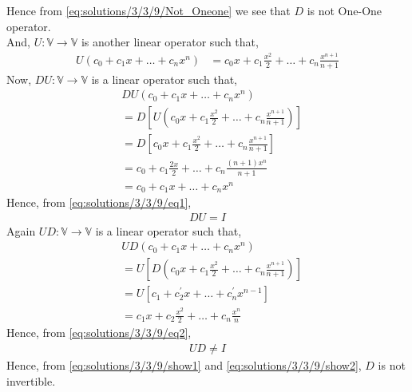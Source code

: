 Hence from \eqref{eq:solutions/3/3/9/Not_Oneone} we see that $D$ is not One-One operator.\\
And, $U:\mathbb{V} \xrightarrow{} \mathbb{V}$ is another linear operator such that,
\begin{align}
U(c_0+c_1x+\dots+c_nx^n) &= c_0x+c_1\frac{x^2}{2}+\dots+c_n\frac{x^{n+1}}{n+1}
\end{align}
Now, $DU:\mathbb{V} \xrightarrow{} \mathbb{V}$ is a linear operator such that,
\begin{align}
&DU(c_0+c_1x+\dots+c_nx^n) \\
&= D[U(c_0x+c_1\frac{x^2}{2}+\dots+c_n\frac{x^{n+1}}{n+1})]\\
&= D[c_0x+c_1\frac{x^2}{2}+\dots+c_n\frac{x^{n+1}}{n+1}]\\
&= c_0+c_1\frac{2x}{2}+\dots+c_n\frac{(n+1)x^{n}}{n+1}\\
&= c_0+c_1x+\dots+c_nx^n\label{eq:solutions/3/3/9/eq1}
\end{align}
Hence, from \eqref{eq:solutions/3/3/9/eq1},
\begin{align}
DU = I\label{eq:solutions/3/3/9/show1}
\end{align}
Again $UD:\mathbb{V} \xrightarrow{} \mathbb{V}$ is a linear operator such that,
\begin{align}
&UD(c_0+c_1x+\dots+c_nx^n) \\
&= U[D(c_0x+c_1\frac{x^2}{2}+\dots+c_n\frac{x^{n+1}}{n+1})]\\
&= U[c_1+c^{\prime}_2x+\dots+c^{\prime}_nx^{n-1}]\\
&= c_1x+c_2\frac{x^2}{2}+\dots+c_n\frac{x^{n}}{n}\label{eq:solutions/3/3/9/eq2}\
\end{align}
Hence, from \eqref{eq:solutions/3/3/9/eq2},
\begin{align}
UD \ne I\label{eq:solutions/3/3/9/show2}
\end{align}
Hence, from \eqref{eq:solutions/3/3/9/show1} and \eqref{eq:solutions/3/3/9/show2}, $D$ is not invertible.
